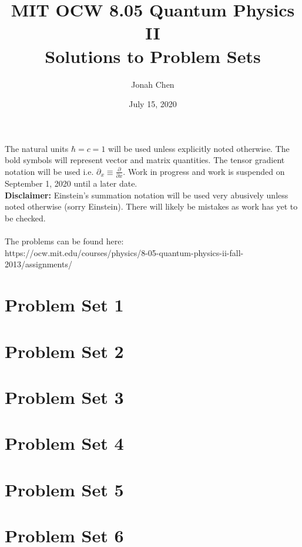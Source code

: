 \documentclass[a4paper]{article}
\title{MIT OCW 8.05 Quantum Physics II \\ Solutions to Problem Sets}
\author{Jonah Chen}
\date{July 15, 2020}
\numberwithin{equation}{section}
\begin{document}
\maketitle
\noindent The natural units $\hbar=c=1$ will be used unless explicitly noted otherwise. The bold symbols will represent vector and matrix quantities. The tensor gradient notation will be used i.e. $\partial_x\equiv\frac{\partial}{\partial x}$. Work in progress and work is suspended on September 1, 2020 until a later date. \\\textbf{Disclaimer:} Einstein's summation notation will be used very abusively unless noted otherwise (sorry Einstein). There will likely be mistakes as work has yet to be checked.\\\\The problems can be found here:\\https://ocw.mit.edu/courses/physics/8-05-quantum-physics-ii-fall-2013/assignments/
\tableofcontents


\newpage
\section{Problem Set 1}
	
	
	
    
    
    
    
\section{Problem Set 2}
    
    
    
    
    
    
\section{Problem Set 3}
	
    
    
    
    
    
\section{Problem Set 4}
	
    
    
    
    
    
    
\section{Problem Set 5}
    
    
    
    
    
    
    
    
    
\section{Problem Set 6}
    
    
    
    
    
    
\end{document}
